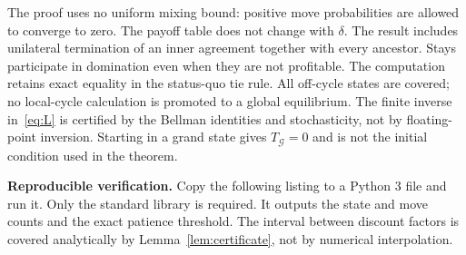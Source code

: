 \documentclass[11pt,a4paper]{article}
\theoremstyle{definition}\newtheorem{definition}[theorem]{Definition}
\theoremstyle{remark}\newtheorem{remark}[theorem]{Remark}
\newcommand{\1}{\mathbf 1}
\begin{document}
The proof uses no uniform mixing bound: positive move probabilities are allowed to converge to zero. The payoff table does not change with $\delta$. The result includes unilateral termination of an inner agreement together with every ancestor. Stays participate in domination even when they are not profitable. The computation retains exact equality in the status-quo tie rule. All off-cycle states are covered; no local-cycle calculation is promoted to a global equilibrium. The finite inverse in~\eqref{eq:L} is certified by the Bellman identities and stochasticity, not by floating-point inversion. Starting in a grand state gives $T_{\mathcal G}=0$ and is not the initial condition used in the theorem.

\textbf{Reproducible verification.} Copy the following listing to a Python 3 file and run it. Only the standard library is required. It outputs the state and move counts and the exact patience threshold. The interval between discount factors is covered analytically by Lemma~\ref{lem:certificate}, not by numerical interpolation.
\end{document}

